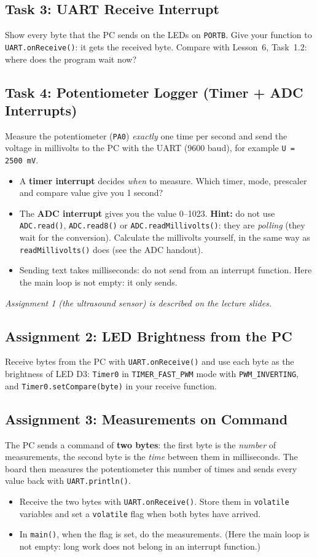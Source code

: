 \documentclass[11pt,a4paper]{article}
\newcommand{\code}[1]{\texttt{#1}}
\begin{document}
\subsection*{Task 3: UART Receive Interrupt}
Show every byte that the PC sends on the LEDs on \code{PORTB}. Give your
function to \code{UART.onReceive()}: it gets the received byte. Compare with
Lesson~6, Task~1.2: where does the program wait now?

\subsection*{Task 4: Potentiometer Logger (Timer + ADC Interrupts)}
Measure the potentiometer (\code{PA0}) \emph{exactly} one time per second and
send the voltage in millivolts to the PC with the UART (9600 baud), for
example \code{U = 2500 mV}.
\begin{itemize}
  \item A \textbf{timer interrupt} decides \emph{when} to measure. Which timer,
        mode, prescaler and compare value give you 1 second?
  \item The \textbf{ADC interrupt} gives you the value 0--1023. \textbf{Hint:} do not use
        \code{ADC.read()}, \code{ADC.read8()} or \code{ADC.readMillivolts()}:
        they are \emph{polling} (they wait for the conversion). Calculate the millivolts yourself, in the same way as
        \code{readMillivolts()} does (see the ADC handout).
  \item Sending text takes milliseconds: do not send from an interrupt function.
        Here the main loop is not empty: it only sends.
\end{itemize}

\medskip\emph{Assignment 1 (the ultrasound sensor) is described on the lecture slides.}

\subsection*{Assignment 2: LED Brightness from the PC}
Receive bytes from the PC with \code{UART.onReceive()} and use each byte as the
brightness of LED D3: \code{Timer0} in \code{TIMER\_FAST\_PWM} mode with
\code{PWM\_INVERTING}, and \code{Timer0.setCompare(byte)} in your receive function.

\subsection*{Assignment 3: Measurements on Command}
The PC sends a command of \textbf{two bytes}: the first byte is the
\emph{number} of measurements, the second byte is the \emph{time} between them
in milliseconds. The board then measures the potentiometer this number of
times and sends every value back with \code{UART.println()}.
\begin{itemize}
  \item Receive the two bytes with \code{UART.onReceive()}. Store them in
        \code{volatile} variables and set a \code{volatile} flag when both bytes
        have arrived.
  \item In \code{main()}, when the flag is set, do the measurements. (Here the main loop
        is not empty: long work does not belong in an interrupt function.)
\end{itemize}
\end{document}
